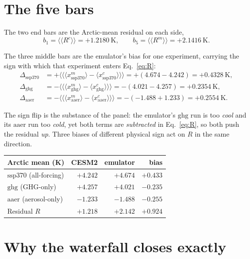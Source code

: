 \documentclass[11pt]{article}
\newcommand{\Xssp}{\mathrm{ssp370}}
\newcommand{\Xghg}{\mathrm{ghg}}
\newcommand{\Xaer}{\mathrm{aaer}}
\newcommand{\ameanN}[1]{\bigl\langle\!\bigl\langle #1 \bigr\rangle\!\bigr\rangle}
\begin{document}
\section*{The five bars}

The two end bars are the Arctic-mean residual on each side,
\begin{equation}
b_{1}=\ameanN{R^{c}}=+1.2180\ \mathrm{K},
\qquad
b_{5}=\ameanN{R^{m}}=+2.1416\ \mathrm{K}.
\end{equation}

The three middle bars are the emulator's bias for one experiment,
carrying the sign with which that experiment enters
Eq.~\eqref{eq:R}:
\begin{align}
\Delta_{\Xssp} &= +\ameanN{\langle x^{m}_{\Xssp}\rangle
   -\langle x^{c}_{\Xssp}\rangle}
   = +(4.674-4.242) = +0.4328\ \mathrm{K},\\
\Delta_{\Xghg} &= -\ameanN{\langle x^{m}_{\Xghg}\rangle
   -\langle x^{c}_{\Xghg}\rangle}
   = -(4.021-4.257) = +0.2354\ \mathrm{K},\\
\Delta_{\Xaer} &= -\ameanN{\langle x^{m}_{\Xaer}\rangle
   -\langle x^{c}_{\Xaer}\rangle}
   = -(-1.488+1.233) = +0.2554\ \mathrm{K}.
\end{align}

The sign flip is the substance of the panel: the emulator's $\Xghg$ run
is too \emph{cool} and its $\Xaer$ run too \emph{cold}, yet both terms
are \emph{subtracted} in Eq.~\eqref{eq:R}, so both push the residual
\emph{up}. Three biases of different physical sign act on $R$ in the same
direction.

\begin{center}
\begin{tabular}{lrrr}
\toprule
Arctic mean (K) & CESM2 & emulator & bias \\
\midrule
$\Xssp$ (all-forcing)  & $+4.242$ & $+4.674$ & $+0.433$ \\
$\Xghg$ (GHG-only)     & $+4.257$ & $+4.021$ & $-0.235$ \\
$\Xaer$ (aerosol-only) & $-1.233$ & $-1.488$ & $-0.255$ \\
\midrule
Residual $R$           & $+1.218$ & $+2.142$ & $+0.924$ \\
\bottomrule
\end{tabular}
\end{center}

\section*{Why the waterfall closes exactly}
\end{document}
